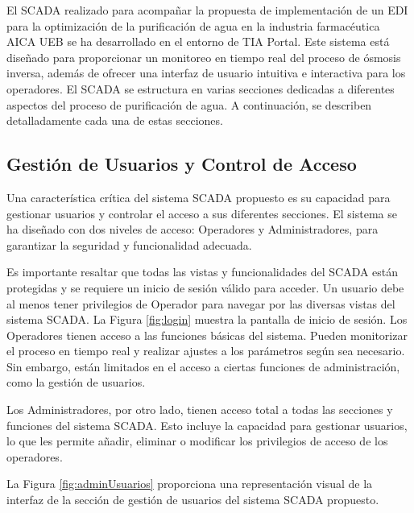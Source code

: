 El SCADA realizado para acompañar la propuesta de implementación de un EDI para la optimización de la purificación de agua en la
industria farmacéutica AICA UEB se ha desarrollado en el entorno de TIA Portal.
Este sistema está diseñado para proporcionar un monitoreo en tiempo real del proceso de ósmosis inversa, además de ofrecer una interfaz de usuario intuitiva e interactiva para los operadores.
El SCADA se estructura en varias secciones dedicadas a diferentes aspectos del proceso de purificación de agua. A continuación, se describen detalladamente cada una de estas secciones.


\subsection{Gestión de Usuarios y Control de Acceso}

Una característica crítica del sistema SCADA propuesto es su capacidad para gestionar usuarios y controlar el acceso a sus diferentes secciones. El sistema se ha diseñado con dos niveles de acceso: Operadores y Administradores, para garantizar la seguridad y funcionalidad adecuada.

Es importante resaltar que todas las vistas y funcionalidades del SCADA están protegidas y se requiere un inicio de sesión válido para acceder. Un usuario debe al menos tener privilegios de Operador para navegar por las diversas vistas del sistema SCADA. La Figura \ref{fig:login} muestra la pantalla de inicio de sesión.
Los Operadores tienen acceso a las funciones básicas del sistema. Pueden monitorizar el proceso en tiempo real y realizar ajustes a los parámetros según sea necesario. Sin embargo, están limitados en el acceso a ciertas funciones de administración, como la gestión de usuarios.

Los Administradores, por otro lado, tienen acceso total a todas las secciones y funciones del sistema SCADA. Esto incluye la capacidad para gestionar usuarios, lo que les permite añadir, eliminar o modificar los privilegios de acceso de los operadores.

La Figura \ref{fig:adminUsuarios} proporciona una representación visual de la interfaz de la sección de gestión de usuarios del sistema SCADA propuesto.
